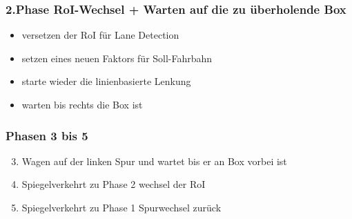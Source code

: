 \documentclass{beamer}
\begin{document}
	\begin{frame}
		\frametitle{2.Phase RoI-Wechsel + Warten auf die zu überholende Box}
		\begin{itemize}
			\item versetzen der RoI für Lane Detection
			\item setzen eines neuen Faktors für Soll-Fahrbahn
			\item starte wieder die linienbasierte Lenkung
			\item warten bis rechts die Box ist
		\end{itemize}
	\end{frame}
	
	\begin{frame}
		\frametitle{Phasen 3 bis 5}
		\begin{enumerate}
			\setcounter{enumi}{2}
			\item Wagen auf der linken Spur und wartet bis er an Box vorbei ist
			\item Spiegelverkehrt zu Phase 2 wechsel der RoI
			\item Spiegelverkehrt zu Phase 1 Spurwechsel zurück
		\end{enumerate}
	\end{frame}
	
\end{document}
